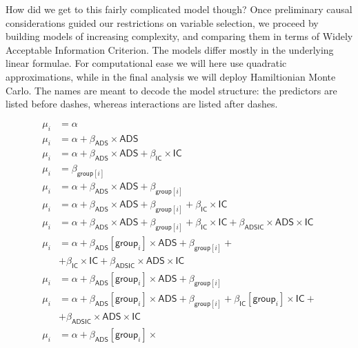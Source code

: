 \documentclass[
  10pt,
  dvipsnames,enabledeprecatedfontcommands]{scrartcl}
\begin{document}
How did we get to this fairly complicated model though? Once preliminary
causal considerations guided our restrictions on variable selection, we
proceed by building models of increasing complexity, and comparing them
in terms of Widely Acceptable Information Criterion. The models differ
mostly in the underlying linear formulae. For computational ease we will
here use quadratic approximations, while in the final analysis we will
deploy Hamiltionian Monte Carlo. The names are meant to decode the model
structure: the predictors are listed before dashes, whereas interactions
are listed after dashes.

\begin{align}
\tag{Null}  \mu_i & = \alpha\\
\tag{ADS}  \mu_i & = \alpha + \beta_{\mathsf{ADS}}\times \mathsf{ADS}\\
\tag{ADSIC}  \mu_i & = \alpha + \beta_{\mathsf{ADS}}\times \mathsf{ADS} +    \beta_{\mathsf{IC}}\times \mathsf{IC}\\
\tag{IT}  \mu_i & = \beta_{\mathsf{group}[i]} \\
\tag{ADSIT} \mu_i & = \alpha + \beta_{\mathsf{ADS}}\times \mathsf{ADS} +  \beta_{\mathsf{group}[i]}\\
\tag{ADSITIC} \mu_i & = \alpha + \beta_{\mathsf{ADS}}\times \mathsf{ADS} +  \beta_{\mathsf{group}[i]} +    \beta_{\mathsf{IC}}\times \mathsf{IC}\\
\tag{ADSITIC-ADSIC} \mu_i & = \alpha + \beta_{\mathsf{ADS}}\times \mathsf{ADS} +  \beta_{\mathsf{group}[i]} +    \beta_{\mathsf{IC}}\times \mathsf{IC} + \beta_{\mathsf{ADSIC}}\times \mathsf{ADS} \times \mathsf{IC}\\
\tag{ADSITIC-ADSIC-ADSIT} \mu_i & = \alpha + \beta_{\mathsf{ADS}}[\mathsf{group}_i]\times \mathsf{ADS} +  \beta_{\mathsf{group}[i]} +  \\ \nonumber & +  \beta_{\mathsf{IC}}\times \mathsf{IC} + \beta_{\mathsf{ADSIC}}\times \mathsf{ADS} \times \mathsf{IC}\\
\tag{ADSIT-ADSIT}   \mu_i &  = \alpha + \beta_{\mathsf{ADS}}[\mathsf{group}_i] \times
 \mathsf{ADS} + \beta_{\mathsf{group}[i]} \\
\tag{ADSITIC-ADSIT-ITIC-ADSIC}   \mu_i &  = \alpha  +  \beta_{\mathsf{ADS}}[\mathsf{group}_i] \times \mathsf{ADS} + \beta_{\mathsf{group}[i]} +  
\beta_{\mathsf{IC}}[\mathsf{group}_i] \times \mathsf{IC} + \\ \nonumber & + \beta_{\mathsf{ADSIC}}\times \mathsf{ADS} \times \mathsf{IC}\\
\tag{ADSITICCBS-ITIC-ADSIC} \mu_i &  = \alpha  +  \beta_{\mathsf{ADS}}[\mathsf{group}_i] \times

\end{align}
\end{document}
